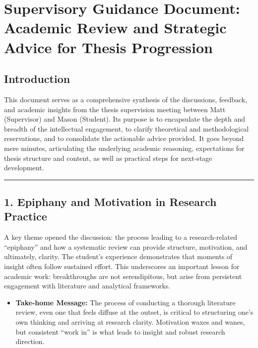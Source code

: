 \documentclass[
]{article}
\author{}
\date{}
\providecommand{\tightlist}{%
  \setlength{\itemsep}{0pt}\setlength{\parskip}{0pt}}
\begin{document}
\section{Supervisory Guidance Document: Academic Review and Strategic
Advice for Thesis
Progression}\label{supervisory-guidance-document-academic-review-and-strategic-advice-for-thesis-progression}

\subsection{Introduction}\label{introduction}

This document serves as a comprehensive synthesis of the discussions,
feedback, and academic insights from the thesis supervision meeting
between Matt (Supervisor) and Mason (Student). Its purpose is to
encapsulate the depth and breadth of the intellectual engagement, to
clarify theoretical and methodological reservations, and to consolidate
the actionable advice provided. It goes beyond mere minutes,
articulating the underlying academic reasoning, expectations for thesis
structure and content, as well as practical steps for next-stage
development.

\begin{center}\rule{0.5\linewidth}{0.5pt}\end{center}

\subsection{1. Epiphany and Motivation in Research
Practice}\label{epiphany-and-motivation-in-research-practice}

A key theme opened the discussion: the process leading to a
research-related ``epiphany'' and how a systematic review can provide
structure, motivation, and ultimately, clarity. The student's experience
demonstrates that moments of insight often follow sustained effort. This
underscores an important lesson for academic work: breakthroughs are not
serendipitous, but arise from persistent engagement with literature and
analytical frameworks.

\begin{itemize}
\tightlist
\item
  \textbf{Take-home Message:} The process of conducting a thorough
  literature review, even one that feels diffuse at the outset, is
  critical to structuring one's own thinking and arriving at research
  clarity. Motivation waxes and wanes, but consistent ``work in'' is
  what leads to insight and robust research direction.
\end{itemize}
\end{document}
